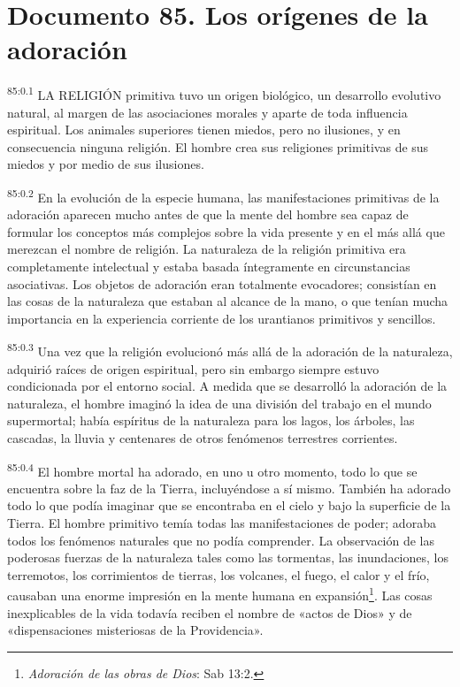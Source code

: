 \chapter{Documento 85. Los orígenes de la adoración}
\par
\textsuperscript{85:0.1} LA RELIGIÓN primitiva tuvo un origen biológico, un desarrollo evolutivo natural, al margen de las asociaciones morales y aparte de toda influencia espiritual. Los animales superiores tienen miedos, pero no ilusiones, y en consecuencia ninguna religión. El hombre crea sus religiones primitivas de sus miedos y por medio de sus ilusiones.

\par
\textsuperscript{85:0.2} En la evolución de la especie humana, las manifestaciones primitivas de la adoración aparecen mucho antes de que la mente del hombre sea capaz de formular los conceptos más complejos sobre la vida presente y en el más allá que merezcan el nombre de religión. La naturaleza de la religión primitiva era completamente intelectual y estaba basada íntegramente en circunstancias asociativas. Los objetos de adoración eran totalmente evocadores; consistían en las cosas de la naturaleza que estaban al alcance de la mano, o que tenían mucha importancia en la experiencia corriente de los urantianos primitivos y sencillos.

\par
\textsuperscript{85:0.3} Una vez que la religión evolucionó más allá de la adoración de la naturaleza, adquirió raíces de origen espiritual, pero sin embargo siempre estuvo condicionada por el entorno social. A medida que se desarrolló la adoración de la naturaleza, el hombre imaginó la idea de una división del trabajo en el mundo supermortal; había espíritus de la naturaleza para los lagos, los árboles, las cascadas, la lluvia y centenares de otros fenómenos terrestres corrientes.

\par
\textsuperscript{85:0.4} El hombre mortal ha adorado, en uno u otro momento, todo lo que se encuentra sobre la faz de la Tierra, incluyéndose a sí mismo. También ha adorado todo lo que podía imaginar que se encontraba en el cielo y bajo la superficie de la Tierra. El hombre primitivo temía todas las manifestaciones de poder; adoraba todos los fenómenos naturales que no podía comprender. La observación de las poderosas fuerzas de la naturaleza tales como las tormentas, las inundaciones, los terremotos, los corrimientos de tierras, los volcanes, el fuego, el calor y el frío, causaban una enorme impresión en la mente humana en expansión\footnote{\textit{Adoración de las obras de Dios}: Sab 13:2.}. Las cosas inexplicables de la vida todavía reciben el nombre de «actos de Dios» y de «dispensaciones misteriosas de la Providencia».

